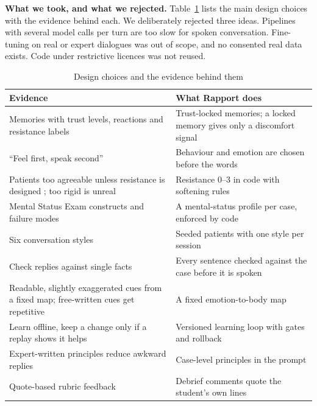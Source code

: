 \documentclass{article}
\begin{document}
\textbf{What we took, and what we rejected.} Table~\ref{tab:built} lists the main design choices with the evidence behind each. We deliberately rejected three ideas. Pipelines with several model calls per turn are too slow for spoken conversation. Fine-tuning on real or expert dialogues was out of scope, and no consented real data exists. Code under restrictive licences was not reused.

\begin{table}[t]
\caption{Design choices and the evidence behind them}
\label{tab:built}
\centering
\scriptsize
\begin{tabular}{ll}
\toprule
Evidence & What Rapport does\\
\midrule
Memories with trust levels, reactions and resistance labels \cite{sabour2026patientact} & Trust-locked memories; a locked memory gives
only a discomfort signal\\
``Feel first, speak second'' \cite{sabour2026patientact} & Behaviour and emotion are chosen before the words\\
Patients too agreeable unless resistance is designed \cite{steenstra2025scaffolding,lee2025psyche}; too rigid is unreal
\cite{bodonhelyi2025modeling} & Resistance 0--3 in code with softening rules\\
Mental Status Exam constructs and failure modes \cite{lee2025psyche} & A mental-status profile per case, enforced by code\\
Six conversation styles \cite{wang2024patient} & Seeded patients with one style per session\\
Check replies against single facts \cite{lai2025patientzero} & Every sentence checked against the case before it is spoken\\
Readable, slightly exaggerated cues from a fixed map; free-written cues get repetitive \cite{haut2025ai,bodonhelyi2025modeling} & A fixed
emotion-to-body map\\
Learn offline, keep a change only if a replay shows it helps \cite{du2024llms,li2024agent,agrawal2025gepa} & Versioned learning loop with gates
and rollback\\
Expert-written principles reduce awkward replies \cite{louie2024roleplaydoh} & Case-level principles in the prompt\\
Quote-based rubric feedback \cite{hicke2025medsimai} & Debrief comments quote the student's own lines\\
\bottomrule
\end{tabular}
\end{table}
\end{document}

